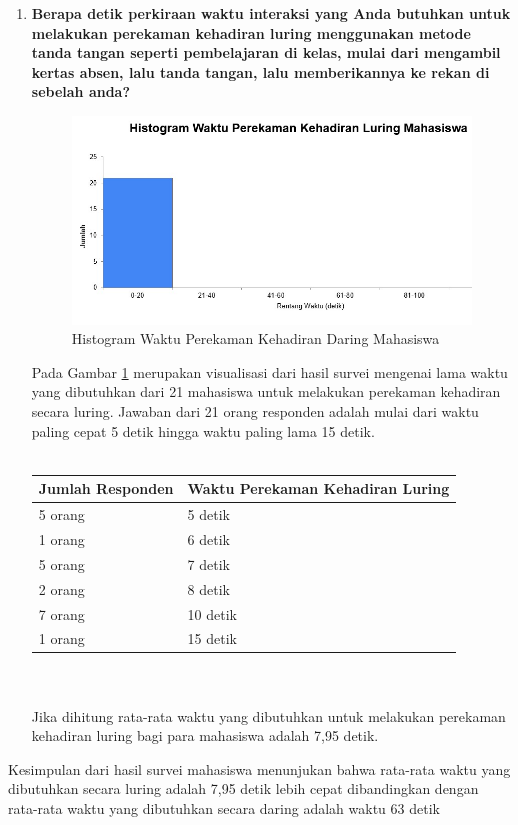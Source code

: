 \documentclass[a4paper,twoside]{article}
\begin{document}
\begin{enumerate}
\begin{enumerate}
			\item \textbf{Berapa detik perkiraan waktu interaksi yang Anda butuhkan untuk melakukan perekaman kehadiran luring menggunakan metode tanda tangan seperti pembelajaran di kelas, mulai dari mengambil kertas absen, lalu tanda tangan, lalu memberikannya ke rekan di sebelah anda?}
			\begin{figure}[H]
				\centering
				\includegraphics[scale=0.8]{Gambar/LuringMahasiswa.jpg}
				\caption{Histogram Waktu Perekaman Kehadiran Daring Mahasiswa} 
				\label{fig:LuringMahasiswa}
			\end{figure}
			Pada Gambar \ref{fig:LuringMahasiswa} merupakan visualisasi dari hasil survei mengenai lama waktu yang dibutuhkan dari 21 mahasiswa untuk melakukan perekaman kehadiran secara luring.
			Jawaban dari 21 orang responden adalah mulai dari waktu paling cepat 5 detik hingga waktu paling lama 15 detik.\\ \\
			\begin{tabular}{|p{4cm} |p{7cm}|}
				\hline
				Jumlah Responden &  Waktu Perekaman Kehadiran Luring \\ \hline     
				5 orang &  5 detik\\ \hline 
				1 orang &  6 detik\\ \hline 
				5 orang &  7 detik\\ \hline 
				2 orang &  8 detik\\ \hline 
				7 orang &  10 detik\\ \hline 
				1 orang &  15 detik\\ \hline
			\end{tabular}\\ \\
			Jika dihitung rata-rata waktu yang dibutuhkan untuk melakukan perekaman kehadiran luring bagi para mahasiswa adalah 7,95 detik.
		\end{enumerate}
		Kesimpulan dari hasil survei mahasiswa menunjukan bahwa rata-rata waktu yang dibutuhkan secara luring adalah 7,95 detik lebih cepat dibandingkan dengan rata-rata waktu yang dibutuhkan secara daring adalah waktu 63 detik
		

\end{enumerate}
\end{document}
